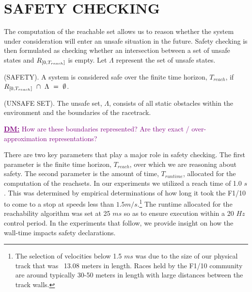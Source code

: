 \documentclass[manuscript,screen,review]{acmart}
\newcommand{\diego}[1]{\textcolor{purple}{\textbf{\underline{DM:}} #1}}
\begin{document}

\section{SAFETY CHECKING}
The computation of the reachable set allows us to reason whether the system under consideration will enter an unsafe situation in the future. Safety checking is then formulated as checking whether an intersection between a set of unsafe states and $\mathnormal{R}_{[0,T_{reach}]}$ is empty. Let $\Lambda$ represent the set of unsafe states.\smallskip

\begin{definition}%
(SAFETY). A system is considered safe over the finite time horizon, $T_{reach}$, if  $\mathnormal{R}_{[0,T_{reach}]} \  \cap \ \Lambda \ = \ \emptyset$.
\end{definition}%
%

\begin{definition}%
(UNSAFE SET). The unsafe set,  $\Lambda$, consists of all static obstacles within the environment and the boundaries of the racetrack.
\end{definition}%

\diego{How are these boundaries represented? Are they exact / over-approximation representations?}

There are two key parameters that play a major role in safety checking. The first parameter is the finite time horizon, $T_{reach}$, over which we are reasoning about safety. The second parameter is the amount of time, $T_{runtime}$, allocated for the computation of the reachsets. In our experiments we utilized a reach time of 1.0 $s$. This was determined by empirical determinations of how long it took the F1/10 to come to a stop at speeds less than $1.5 m/s.$\footnote{The selection of velocities below 1.5 $ms$ was due to the size of our physical track that was ~13.08 meters in length. Races held by the F1/10 community are around typically 30-50 meters in length with large distances between the track walls.} The runtime allocated for the reachability algorithm was set at 25 $ms$ so as to ensure execution within a 20 $Hz$ control period. In the experiments that follow, we provide insight on how the wall-time impacts safety declarations. 
\end{document}
